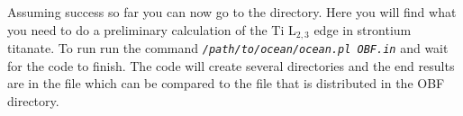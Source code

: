 \documentclass[11pt]{report}
\begin{document}
Assuming success so far you can now go to the  directory. Here you will find what you need to do a preliminary 
calculation of the Ti L$_{2,3}$ edge in strontium titanate. To run  run the command \texttt{\textsl{/path/to/ocean/ocean.pl OBF.in}}  
and wait for the code to finish. The code will create several directories and the end results are in the file  which can 
be compared to the  file that is distributed in the OBF directory.  




\end{document}
